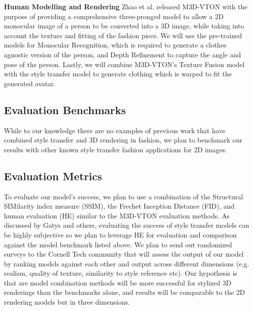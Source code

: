 \documentclass{article}
\begin{document}
\textbf{Human Modelling and Rendering} Zhao et al. released M3D-VTON\cite{m3dvton} with the purpose of providing a comprehensive three-pronged model to allow a 2D monocular image of a person to be converted into a 3D image, while taking into account the texture and fitting of the fashion piece. We will use the pre-trained models for Monocular Recognition, which is required to generate a clothes agnostic version of the person, and Depth Refinement to capture the angle and pose of the person. Lastly, we will combine M3D-VTON's Texture Fusion model with the style transfer model to generate clothing which is warped to fit the generated avatar. 

\subsection{Evaluation Benchmarks}
While to our knowledge there are no examples of previous work that have combined style transfer and 3D rendering in fashion, we plan to benchmark our results with other known style transfer fashion applications for 2D images\cite{date2017fashion2d}\cite{wang2020fashionSegmentation}.

\subsection{Evaluation Metrics}
To evaluate our model's success, we plan to use a combination of the Structural SIMilarity index measure (SSIM)\cite{wang2015eval}, the Frechet Inception Distance (FID)\cite{salimans2016eval}, and human evaluation (HE) similar to the M3D-VTON evaluation methods\cite{m3dvton}. As discussed by Gatys\cite{gatys2016styleTransfer} and others\cite{borji2018eval}\cite{zhou2019hype}, evaluating the success of style transfer models can be highly subjective so we plan to leverage HE for evaluation and comparison against the model benchmark listed above. We plan to send out randomized surveys to the Cornell Tech community that will assess the output of our model by ranking models against each other and output across different dimensions (e.g. realism, quality of texture, similarity to style reference etc). Our hypothesis is that are model combination methods will be more successful for stylized 3D renderings than the benchmarks alone, and results will be comparable to the 2D rendering models but in three dimensions.
\end{document}
